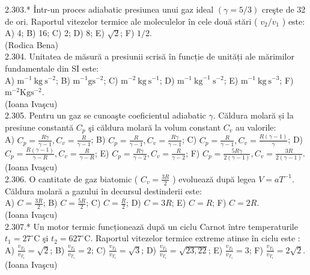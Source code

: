 2.303.* Într-un proces adiabatic presiunea unui gaz ideal $(\gamma=5 / 3)$ creşte de 32 de ori. Raportul vitezelor termice ale moleculelor în cele două stări ( $v_{2} / v_{1}$ ) este:\\ A) 4; B) 16; C) 2; D) 8; E) $\sqrt{2}$; F) $1 / 2$.\\ (Rodica Bena)\\

2.304. Unitatea de măsură a presiunii scrisă în funcție de unități ale mărimilor fundamentale din SI este:\\ A) $\mathrm{m}^{-1} \mathrm{~kg} \mathrm{~s}^{-2}$; B) $\mathrm{m}^{-1} \mathrm{gs}^{-2}$; C) $\mathrm{m}^{-2} \mathrm{~kg} \mathrm{~s}^{-1}$; D) $\mathrm{m}^{-1} \mathrm{~kg}^{-1} \mathrm{~s}^{-2}$; E) $\mathrm{m}^{-1} \mathrm{~kg} \mathrm{~s}^{-3}$; F) $\mathrm{m}^{-2} \mathrm{Kg} \mathrm{s}^{-2}$.\\ (Ioana Ivaşcu)\\

2.305. Pentru un gaz se cunoaşte coeficientul adiabatic $\gamma$. Căldura molară și la presiune constantă $C_{p}$ şi căldura molară la volum constant $C_{v}$ au valorile:\\ A) $C_{p}=\frac{R \gamma}{\gamma-1} , C_{v}=\frac{R}{\gamma-1}$; B) $C_{p}=\frac{R}{\gamma-1} , C_{v}=\frac{R \gamma}{\gamma-1}$; C) $C_{p}=\frac{R}{\gamma-1} , C_{v}=\frac{R(\gamma-1)}{\gamma}$; D) $C_{p}=\frac{R(\gamma-1)}{\gamma-R} , C_{v}=\frac{R}{\gamma-R}$; E) $C_{p}=\frac{R \gamma}{\gamma-2} , C_{v}=\frac{R}{\gamma-2}$; F) $C_{p}=\frac{5 R \gamma}{2(\gamma-1)} , C_{v}=\frac{3 R}{2(\gamma-1)}$.\\ (Ioana Ivaşcu)\\

2.306. O cantitate de gaz biatomic ( $C_{v}=\frac{3 R}{2}$ ) evoluează după legea $V=a T^{-1}$. Căldura molară a gazului în decursul destinderii este:\\ A) $C=\frac{3 R}{2}$; B) $C=\frac{5 R}{2}$; C) $C=\frac{R}{2}$; D) $C=3 R$; E) $C=R$; F) $C=2 R$.\\ (Ioana Ivaşcu)\\

2.307.* Un motor termic funcționează după un ciclu Carnot între temperaturile $t_{1}=27^{\circ} \mathrm{C}$ şi $t_{2}=627^{\circ} \mathrm{C}$. Raportul vitezelor termice extreme atinse în ciclu este :\\ A) $\frac{v_{T_{2}}}{v_{T_{1}}}=\sqrt{2}$; B) $\frac{v_{T_{2}}}{v_{T_{1}}}=2$; C) $\frac{v_{T_{2}}}{v_{T_{1}}}=\sqrt{3}$; D) $\frac{v_{T_{2}}}{v_{T_{1}}}=\sqrt{23,22}$; E) $\frac{v_{T_{2}}}{v_{T_{1}}}=3$; F) $\frac{v_{T_{2}}}{v_{T_{1}}}=2 \sqrt{2}$.\\ (Ioana Ivaşcu)\\

